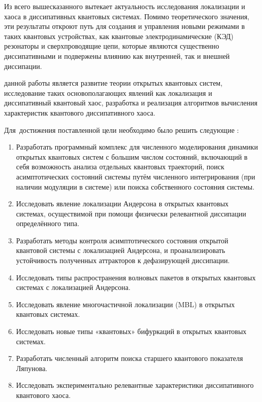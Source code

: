 Из всего вышесказанного вытекает актуальность исследования локализации и хаоса в диссипативных квантовых системах. Помимо теоретического значения, эти результаты откроют путь для создания и управления новыми режимами в таких квантовых устройствах, как квантовые электродинамические (КЭД) резонаторы \autocite{Imamoglu1999, Walther2006, Arakawa2015}  и сверхпроводящие цепи, которые являются существенно диссипативными и подвержены влиянию как внутренней, так и внешней диссипации.

{\aim} данной работы является развитие теории открытых квантовых систем, исследование таких основополагающих явлений как локализация и диссипативный квантовый хаос, разработка и реализация алгоритмов вычисления характеристик квантового диссипативного хаоса.

Для~достижения поставленной цели необходимо было решить следующие {\tasks}:
\begin{enumerate}[beginpenalty=10000] %
	\item Разработать программный комплекс для численного моделирования динамики открытых квантовых систем с большим числом состояний, включающий в себя возможность анализа отдельных квантовых траекторий, поиск асимптотических состояний системы путём численного интегрирования (при наличии модуляции в системе) или поиска собственного состояния системы.
	\item Исследовать явление локализации Андерсона в открытых квантовых системах, осуществимой при помощи физически релевантной диссипации определённого типа.
	\item Разработать методы контроля асимптотического состояния открытой квантовой системы с локализацией Андерсона, и проанализировать устойчивость полученных аттракторов к дефазирующей диссипации.
	\item Исследовать типы распространения волновых пакетов в открытых квантовых системах с локализацией Андерсона.
	\item Исследовать явление многочастичной локализации (MBL) в открытых квантовых системах.
	\item Исследовать новые типы «квантовых» бифуркаций в открытых квантовых системах.
	\item Разработать численный алгоритм поиска старшего квантового показателя Ляпунова.
	\item Исследовать экспериментально релевантные характеристики диссипативного квантового хаоса.
\end{enumerate}


